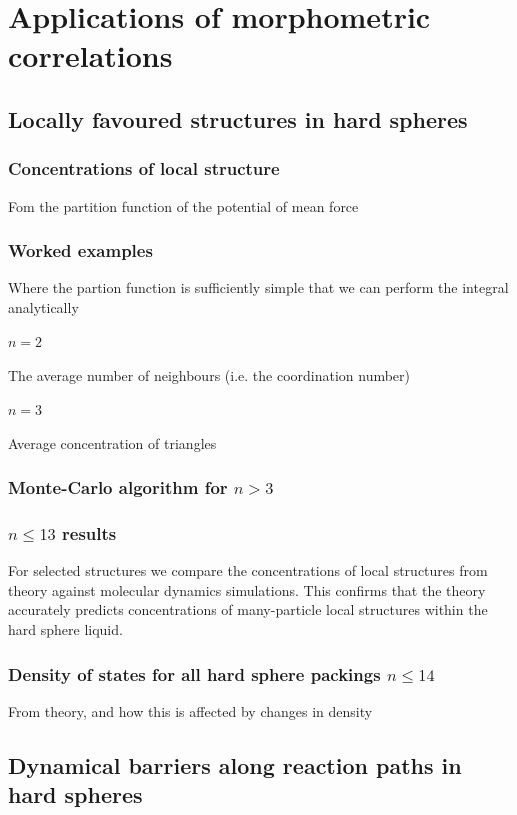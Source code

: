 \documentclass[12pt]{report}
\begin{document}
\chapter{Applications of morphometric correlations}

\section{Locally favoured structures in hard spheres}
\subsection{Concentrations of local structure}
Fom the partition function of the potential of mean force
\subsection{Worked examples}
Where the partion function is sufficiently simple that we can perform the integral analytically
\subsubsection{$n = 2$}
The average number of neighbours (i.e. the coordination number)
\subsubsection{$n = 3$}
Average concentration of triangles
\subsection{Monte-Carlo algorithm for $n > 3$}
\subsection{$n ≤ 13$ results}
For selected structures we compare the concentrations of local structures from theory against molecular dynamics simulations.
This confirms that the theory accurately predicts concentrations of many-particle local structures within the hard sphere liquid.
\subsection{Density of states for all hard sphere packings $n \le 14$}
From theory, and how this is affected by changes in density

\section{Dynamical barriers along reaction paths in hard spheres}
\end{document}
